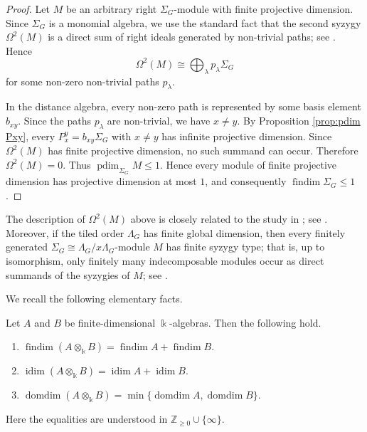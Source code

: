 \documentclass[a4paper,leqno]{amsart}
\begin{document}
\begin{proof}
Let $M$ be an arbitrary right $\Sigma_G$-module with finite
projective dimension. Since $\Sigma_G$ is a monomial algebra, we use the standard fact that the second syzygy $\Omega^2(M)$ is a direct sum of right ideals generated by non-trivial paths; see \cite[Theorem I]{HZ91}. Hence
$$\Omega^2(M)\cong \bigoplus_{\lambda} p_\lambda \Sigma_G$$
for some non-zero non-trivial paths $p_\lambda$.

In the distance algebra, every non-zero path is represented by some basis element $b_{xy}$. Since the paths $p_\lambda$ are non-trivial, we have $x\neq y$. By Proposition \ref{prop:pdim Pxy}, every $P_x^y=b_{xy}\Sigma_G$ with $x\neq y$ has infinite projective dimension. Since $\Omega^2(M)$ has finite projective dimension, no such summand can occur. Therefore $\Omega^2(M)=0$. Thus $\operatorname{pdim}_{\Sigma_G}M\leq 1$.
Hence every module of finite projective dimension has projective dimension at most $1$, and consequently $\operatorname{findim} \Sigma_G\leq 1$.
\end{proof}
\begin{rmk}
The description of $\Omega^2(M)$ above is closely related to the study in \cite[Section~2]{GHZ98}; see \cite[Example~2.3(a)]{GHZ98}. Moreover, if the tiled order $\Lambda_G$ has finite global dimension, then every finitely generated $\Sigma_G\cong\Lambda_G/x\Lambda_G$-module $M$ has finite syzygy type; that is, up to isomorphism, only finitely many indecomposable modules occur as direct summands of the syzygies of $M$; see \cite[Corollary~4.4]{GHZ98}.
\end{rmk}

We recall the following elementary facts.
\begin{prop}\label{prop:homological-dimensions-tensor}
Let $A$ and $B$ be finite-dimensional $\Bbbk$-algebras. Then the following hold.
\begin{enumerate}
    \item {\rm 
\cite[Theorem~16]{ERZ57}} $\operatorname{findim}(A\otimes_{\Bbbk}B)=\operatorname{findim}A+\operatorname{findim}B$.
\item {\rm\cite[Theorem~XI.3.1]{CE56}} $\operatorname{idim}(A\otimes_{\Bbbk}B)=\operatorname{idim}A+\operatorname{idim}B$.
\item {\rm \cite[Lemma~6]{Mul68}} $\operatorname{domdim}(A\otimes_{\Bbbk}B)=\min\{\operatorname{domdim}A,\operatorname{domdim}B\}$.
\end{enumerate}
Here the equalities are understood in $\mathbb Z_{\geq 0}\cup\{\infty\}$.
\end{prop}
\end{document}
